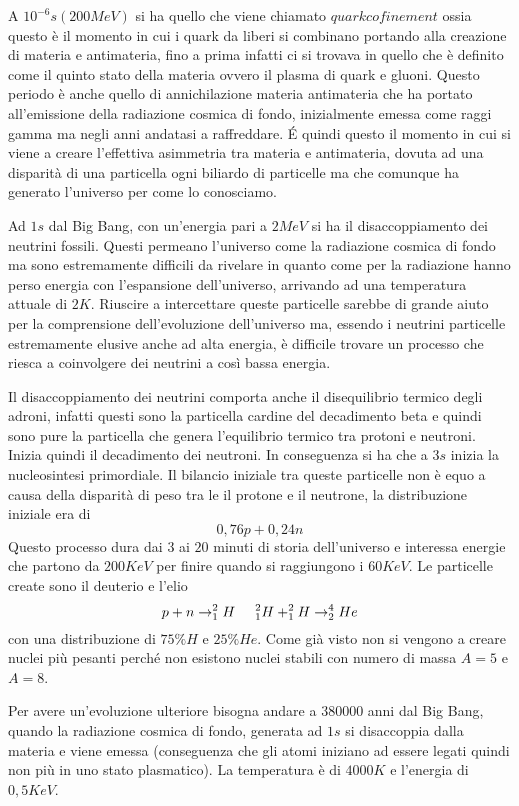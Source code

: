 A $10^{-6}s (200 MeV)$ si ha quello che viene chiamato $quark cofinement$ ossia questo è il momento in cui i quark da liberi si combinano portando alla creazione di materia e antimateria, fino a prima infatti ci si trovava in quello che è definito come il quinto stato della materia ovvero il plasma di quark e gluoni.
Questo periodo è anche quello di annichilazione materia antimateria che ha portato all'emissione della radiazione cosmica di fondo, inizialmente emessa come raggi gamma ma negli anni andatasi a raffreddare.
\'E quindi questo il momento in cui si viene a creare l'effettiva asimmetria tra materia e antimateria, dovuta ad una disparità di una particella ogni biliardo di particelle ma che comunque ha generato l'universo per come lo conosciamo.

Ad $1s$ dal Big Bang, con un'energia pari a $2MeV$ si ha il disaccoppiamento dei neutrini fossili.
Questi permeano l'universo come la radiazione cosmica di fondo ma sono estremamente difficili da rivelare in quanto come per la radiazione hanno perso energia con l'espansione dell'universo, arrivando ad una temperatura attuale di $2K$.
Riuscire a intercettare queste particelle sarebbe di grande aiuto per la comprensione dell'evoluzione dell'universo ma, essendo i neutrini particelle estremamente elusive anche ad alta energia, è difficile trovare un processo che riesca a coinvolgere dei neutrini a così bassa energia.

Il disaccoppiamento dei neutrini comporta anche il disequilibrio termico degli adroni, infatti questi sono la particella cardine del decadimento beta e quindi sono pure la particella che genera l'equilibrio termico tra protoni e neutroni.
Inizia quindi il decadimento dei neutroni.
In conseguenza si ha che a $3s$ inizia la nucleosintesi primordiale.
Il bilancio iniziale tra queste particelle non è equo a causa della disparità di peso tra le il protone e il neutrone, la distribuzione iniziale era di 
\[
0,76p+0,24n
\]
Questo processo dura dai $3$ ai $20$ minuti di storia dell'universo e interessa energie che partono da $200KeV$ per finire quando si raggiungono i $60KeV$.
Le particelle create sono il deuterio e l'elio
\[
p+n\to^2_1H\hspace{0.5cm}^2_1H+^2_1H\to^4_2He
\]
con una distribuzione di $75\%H$ e $25\%He$.
Come già visto non si vengono a creare nuclei più pesanti perché non esistono nuclei stabili con numero di massa $A=5$ e $A=8$.

Per avere un'evoluzione ulteriore bisogna andare a $380000$ anni dal Big Bang, quando la radiazione cosmica di fondo, generata ad $1s$ si disaccoppia dalla materia e viene emessa (conseguenza che gli atomi iniziano ad essere legati quindi non più in uno stato plasmatico).
La temperatura è di $4000K$ e l'energia di $0,5KeV$.

